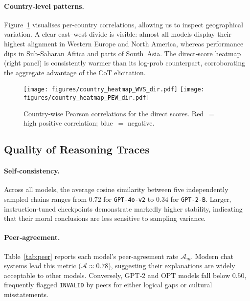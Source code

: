 \documentclass[11pt]{article}
\begin{document}
\paragraph{Country‑level patterns.}
Figure~\ref{fig:country_heatmaps_new} visualises per‑country correlations,
allowing us to inspect geographical variation.  A clear east–west divide is
visible: almost all models display their highest alignment in Western Europe
and North America, whereas performance dips in Sub‑Saharan Africa and parts of
South Asia.  The direct‑score heatmap (right panel) is consistently warmer than
its log‑prob counterpart, corroborating the aggregate advantage of the CoT
elicitation.

\begin{figure}[ht]
  \centering
  \texttt{[image: figures/country\_heatmap\_WVS\_dir.pdf]}\hfill
  \texttt{[image: figures/country\_heatmap\_PEW\_dir.pdf]}
  \caption{\small Country‑wise Pearson correlations for the direct
  scores.  Red $=$ high positive correlation; blue $=$ negative.}
  \label{fig:country_heatmaps_new}
\end{figure}

\subsection{Quality of Reasoning Traces}
\label{sec:results:cot}

\paragraph{Self‑consistency.}
Across all models, the average cosine similarity between five independently
sampled chains ranges from $0.72$ for \texttt{GPT‑4o‑v2} to $0.34$ for
\texttt{GPT‑2‑B}.  Larger, instruction‑tuned checkpoints demonstrate markedly
higher stability, indicating that their moral conclusions are less sensitive to
sampling variance.

\paragraph{Peer‑agreement.}
Table~\ref{tab:peer} reports each model’s peer‑agreement rate
$\mathcal{A}_{m}$.  Modern chat systems lead this metric
($\mathcal{A}\!\approx\!0.78$), suggesting their explanations are widely
acceptable to other models.  Conversely, GPT‑2 and OPT models fall below
$0.50$, frequently flagged \texttt{INVALID} by peers for either logical gaps or
cultural misstatements.
\end{document}
